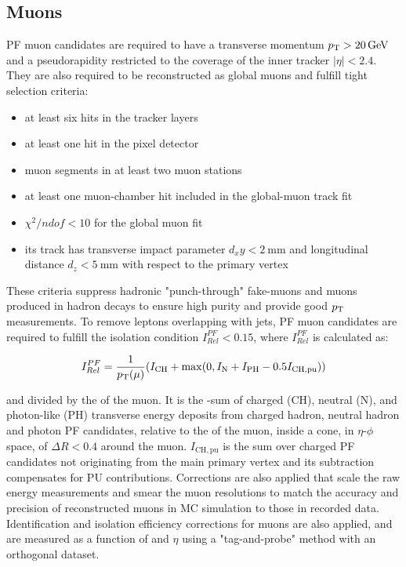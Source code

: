 \subsection{Muons}
PF muon candidates are required to have a transverse momentum $\pT > \SI{20}{\GeV}$ and a pseudorapidity restricted to the coverage of the inner tracker $\vert \eta \vert < 2.4$.
They are also required to be reconstructed as global muons and fulfill tight selection criteria: 
\begin{itemize}
    \item at least six hits in the tracker layers
    \item at least one hit in the pixel detector
    \item muon segments in at least two muon stations
    \item at least one muon-chamber hit included in the global-muon track fit
    \item $\chi^2/ndof < 10$ for the global muon fit
    \item its track has transverse impact parameter $d_xy< \SI{2}{\mm}$ and longitudinal distance $d_z< \SI{5}{\mm}$ with respect to the primary vertex
\end{itemize}
These criteria suppress hadronic "punch-through" fake-muons and muons produced in hadron decays to ensure high purity and provide good $p_{\mathrm{T}}$ measurements.
To remove leptons overlapping with jets, PF muon candidates are required to fulfill the isolation condition $I^{PF}_{Rel}< 0.15$, where $I^{PF}_{Rel}$ is calculated as: 
\begin{linenomath*}
\begin{align}
I^{PF}_{Rel} = \frac{1}{p_{\mathrm{T}}(\mu)}(I_\mathrm{CH} + \max(0, I_\mathrm{N} + I_\mathrm{PH} - 0.5 I_\mathrm{CH,pu}))
\end{align}
\end{linenomath*}
and divided by the \pT of the muon.
It is the \pT-sum of charged (CH), neutral (N), and photon-like (PH) transverse energy deposits from charged hadron, neutral hadron and photon PF candidates, relative to the \pT of the muon, inside a cone, in $\eta$-$\phi$ space, of $\Delta R < 0.4$ around the muon.
$I_\mathrm{CH,pu}$ is the sum over charged PF candidates not originating from the main primary vertex and its subtraction compensates for PU contributions. 
Corrections are also applied that scale the raw energy measurements and smear the muon resolutions to match the accuracy and precision of reconstructed muons in MC simulation to those in recorded data.
Identification and isolation efficiency corrections for muons are also applied, and are measured as a function of \pT and $\eta$ using a "tag-and-probe" method with an orthogonal dataset.

